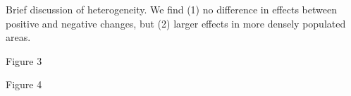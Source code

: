 \documentclass[12pt,a4paper]{article}
\begin{document}





Brief discussion of heterogeneity. We find (1) no difference in effects between positive and negative changes, but (2) larger effects in more densely populated areas. 

Figure 3

Figure 4





\end{document}
